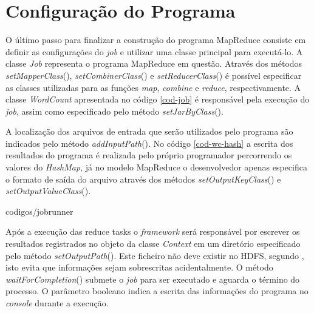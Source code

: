 \section{Configuração do Programa}

O último passo para finalizar a construção do programa MapReduce consiste em definir as configurações do \textit{job} e utilizar uma classe principal para executá-lo. A classe \textit{Job} representa o programa MapReduce em questão. Através dos métodos \textit{setMapperClass}(), \textit{setCombinerClass}() e \textit{setReducerClass}() é possível especificar as classes utilizadas para as funções \textit{map}, \textit{combine} e \textit{reduce}, respectivamente. A classe \textit{WordCount} apresentada no código \ref{cod-job} é responsável pela execução do \textit{job}, assim como especificado pelo método \textit{setJarByClass}().

A localização dos arquivos de entrada que serão utilizados pelo programa são indicados pelo método \textit{addInputPath}(). No código \ref{cod-wc-hash} a escrita dos resultados do programa é realizada pelo próprio programador percorrendo os valores do \textit{HashMap}, já no modelo MapReduce o desenvolvedor apenas especifica o formato de saída do arquivo através dos métodos \textit{setOutputKeyClass}() e \textit{setOutputValueClass}().


		{codigos/jobrunner}

Após a execução das reduce tasks o \textit{framework} será responsável por escrever os resultados registrados no objeto da classe \textit{Context} em um diretório  especificado pelo método \textit{setOutputPath}(). Este ficheiro não deve existir no HDFS, segundo , isto evita que informações sejam sobrescritas acidentalmente. O método \textit{waitForCompletion}() submete o \textit{job} para ser executado e aguarda o término do processo. O parâmetro booleano indica a escrita das informações do programa no \textit{console} durante a execução.


